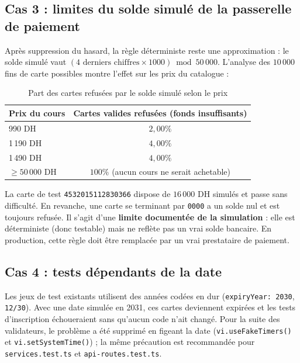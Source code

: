 \documentclass[12pt,a4paper]{article}
\begin{document}
\subsection{Cas 3 : limites du solde simulé de la passerelle de paiement}
Après suppression du hasard, la règle déterministe reste une approximation : le solde simulé vaut $(\text{4 derniers chiffres} \times 1000) \bmod 50\,000$. L'analyse des $10\,000$ fins de carte possibles montre l'effet sur les prix du catalogue :
\begin{table}[h!]
\centering
\small
\begin{tabular}{lc}
\toprule
\textbf{Prix du cours} & \textbf{Cartes valides refusées (fonds insuffisants)} \\
\midrule
990 DH & $2{,}00\%$ \\
1\,190 DH & $4{,}00\%$ \\
1\,490 DH & $4{,}00\%$ \\
$\geq 50\,000$ DH & $100\%$ (aucun cours ne serait achetable) \\
\bottomrule
\end{tabular}
\caption{Part des cartes refusées par le solde simulé selon le prix}
\end{table}

La carte de test \texttt{4532015112830366} dispose de $16\,000$ DH simulés et passe sans difficulté. En revanche, une carte se terminant par \texttt{0000} a un solde nul et est toujours refusée. Il s'agit d'une \textbf{limite documentée de la simulation} : elle est déterministe (donc testable) mais ne reflète pas un vrai solde bancaire. En production, cette règle doit être remplacée par un vrai prestataire de paiement.

\subsection{Cas 4 : tests dépendants de la date}
Les jeux de test existants utilisent des années codées en dur (\texttt{expiryYear: 2030}, \texttt{12/30}). Avec une date simulée en 2031, ces cartes deviennent expirées et les tests d'inscription échoueraient sans qu'aucun code n'ait changé. Pour la suite des validateurs, le problème a été supprimé en figeant la date (\texttt{vi.useFakeTimers()} et \texttt{vi.setSystemTime()}) ; la même précaution est recommandée pour \texttt{services.test.ts} et \texttt{api-routes.test.ts}.
\end{document}

